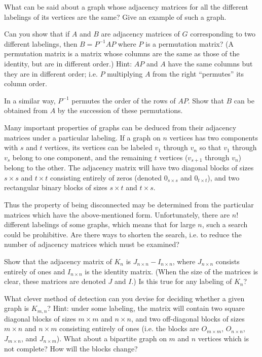 \documentclass{article}
\begin{document}
What can be said about a graph whose adjacency matrices for all the different labelings of its vertices are the same? Give an example of such a graph.

Can you show that if $A$ and $B$ are adjacency matrices of $G$ corresponding to two different labelings, then $B=P^{-1}AP$ where $P$ is a permutation matrix? (A permutation matrix is a matrix whose columns are the same as those of the identity, but are in different order.) Hint: $AP$ and $A$ have the same columns but they are in different order; i.e. $P$ multiplying $A$ from the right ``permutes'' its column order.

In a similar way, $P^{-1}$ permutes the order of the rows of $AP$. Show that $B$ can be obtained from $A$ by the succession of these permutations.

Many important properties of graphs can be deduced from their adjacency matrices under a particular labeling. If a graph on $n$ vertices has two components with $s$ and $t$ vertices, its vertices can be labeled $v_1$ through $v_n$ so that $v_1$ through $v_s$ belong to one component, and the remaining $t$ vertices ($v_{s+1}$ through $v_n$) belong to the other. The adjacency matrix will have two diagonal blocks of sizes $s \times s$ and $t\times t$ consisting entirely of zeros (denoted $0_{s \times s}$ and $0_{t \times t}$), and two rectangular binary blocks of sizes $s \times t$ and $t \times s$.

Thus the property of being disconnected may be determined from the particular matrices which have the above-mentioned form. Unfortunately, there are $n!$ different labelings of some graphs, which means that for large $n$, such a search could be prohibitive. Are there ways to shorten the search, i.e. to reduce the number of adjacency matrices which must be examined?

Show that the adjacency matrix of $K_n$ is $J_{n \times n} - I_{n \times n}$, where $J_{n \times n}$ consists entirely of ones and $I_{n \times n}$ is the identity matrix. (When the size of the matrices is clear, these matrices are denoted $J$ and $I$.) Is this true for any labeling of $K_n$?

What clever method of detection can you devise for deciding whether a given graph is $K_{m,n}$? Hint: under some labeling, the matrix will contain two square diagonal blocks of sizes $m \times m$ and $n \times n$, and two off-diagonal blocks of sizes $m \times n$ and $n \times m$ consisting entirely of ones (i.e. the blocks are $O_{m \times m}$, $O_{n \times n}$, $J_{m \times n}$,  and $J_{n \times m}$). What about a bipartite graph on $m$ and $n$ vertices which is not complete? How will the blocks change?
\end{document}
